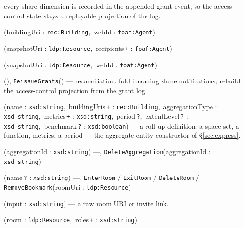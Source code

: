 \documentclass[11pt,a4paper]{article}
\theoremstyle{remark}
\begin{document}
\begin{description}
\begin{description}
  every share dimension is recorded in the appended grant event, so the
  access-control state stays a replayable projection of the log.
\item[\texttt{RevokeBuildingAccess}] (buildingUri : \texttt{rec:Building},\ webId : \texttt{foaf:Agent})
\item[\texttt{ShareAggregation}] (snapshotUri : \texttt{ldp:Resource},\ recipients\,\texttt{+} : \texttt{foaf:Agent})
\item[\texttt{RevokeAggregationAccess}] (snapshotUri : \texttt{ldp:Resource},\ webId : \texttt{foaf:Agent})
\item[\texttt{DrainInbox}] (), \texttt{ReissueGrants}() ---
  reconciliation: fold incoming share notifications; rebuild the access-control
  projection from the grant log.
\end{description}
\item[Aggregations]\hfill
\begin{description}\setlength\itemsep{0pt}
\item[\texttt{CreateAggregation}] (name : \texttt{xsd:string},\ buildingUris\,\texttt{+} : \texttt{rec:Building},\ aggregationType : \texttt{xsd:string},\ metrics\,\texttt{+} : \texttt{xsd:string},\ period\,\texttt{?},\ extentLevel\,\texttt{?} : \texttt{xsd:string},\ benchmark\,\texttt{?} : \texttt{xsd:boolean}) ---
  a roll-up definition: a space set, a function, metrics, a period --- the
  aggregate-entity constructor of \S\ref{sec:express}.
\item[\texttt{RefreshAggregation}] (aggregationId : \texttt{xsd:string}) ---,
  \texttt{DeleteAggregation}(aggregationId : \texttt{xsd:string})
\end{description}
\item[Rooms]\hfill
\begin{description}\setlength\itemsep{0pt}
\item[\texttt{CreateRoom}] (name\,\texttt{?} : \texttt{xsd:string}) ---,
  \texttt{EnterRoom} / \texttt{ExitRoom} / \texttt{DeleteRoom} /
  \texttt{RemoveBookmark}(roomUri : \texttt{ldp:Resource})
\item[\texttt{AddBookmark}] (input : \texttt{xsd:string}) --- a raw room URI or invite link.
\item[\texttt{SaveRoles}] (room : \texttt{ldp:Resource},\ roles\,\texttt{+} : \texttt{xsd:string})
\end{description}
\item[Agents \& organisation]\hfill
\begin{description}\setlength\itemsep{0pt}

\end{description}
\end{description}
\end{document}
